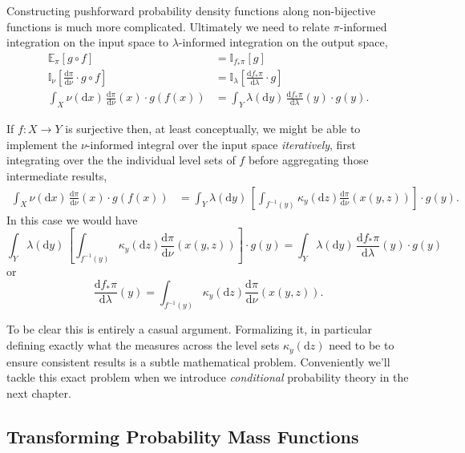 \documentclass[
  letterpaper,
  DIV=11,
  numbers=noendperiod]{scrartcl}
\begin{document}
Constructing pushforward probability density functions along
non-bijective functions is much more complicated. Ultimately we need to
relate \(\pi\)-informed integration on the input space to
\(\lambda\)-informed integration on the output space, \begin{align*}
\mathbb{E}_{\pi}[g \circ f]
&=
\mathbb{I}_{f_{*} \pi}[g]
\\
\mathbb{I}_{\nu} \left[
\frac{ \mathrm{d} \pi }{ \mathrm{d} \nu } \cdot g \circ f
\right]
&=
\mathbb{I}_{\lambda} \left[
\frac{ \mathrm{d} f_{*} \pi }{ \mathrm{d} \lambda } \cdot g
\right]
\\
\int_{X} \nu(\mathrm{d}x) \,
\frac{ \mathrm{d} \pi }{ \mathrm{d} \nu }(x) \cdot g(f(x))
&=
\int_{Y} \lambda(\mathrm{d}y) \,
\frac{ \mathrm{d} f_{*} \pi }{ \mathrm{d} \lambda }(y) \cdot g(y).
\end{align*}

If \(f: X \rightarrow Y\) is surjective then, at least conceptually, we
might be able to implement the \(\nu\)-informed integral over the input
space \emph{iteratively}, first integrating over the the individual
level sets of \(f\) before aggregating those intermediate results,
\begin{align*}
\int_{X} \nu(\mathrm{d}x) \,
\frac{ \mathrm{d} \pi }{ \mathrm{d} \nu }(x) \cdot g(f(x))
&=
\int_{Y} \lambda(\mathrm{d}y) \,
\left[
\int_{f^{-1}(y)} \kappa_{y}(\mathrm{d}z)
\frac{ \mathrm{d} \pi }{ \mathrm{d} \nu }(x(y, z))
\right] \cdot g(y).
\end{align*} In this case we would have \[
\int_{Y} \lambda(\mathrm{d}y) \,
\left[
\int_{f^{-1}(y)} \kappa_{y}(\mathrm{d}z)
\frac{ \mathrm{d} \pi }{ \mathrm{d} \nu }(x(y, z))
\right] \cdot g(y)
=
\int_{Y} \lambda(\mathrm{d}y) \,
\frac{ \mathrm{d} f_{*} \pi }{ \mathrm{d} \lambda }(y) \cdot g(y)
\] or \[
\frac{ \mathrm{d} f_{*} \pi }{ \mathrm{d} \lambda }(y)
=
\int_{f^{-1}(y)} \kappa_{y}(\mathrm{d}z)
\frac{ \mathrm{d} \pi }{ \mathrm{d} \nu }(x(y, z)).
\]

To be clear this is entirely a casual argument. Formalizing it, in
particular defining exactly what the measures across the level sets
\(\kappa_{y}(\mathrm{d}z)\) need to be to ensure consistent results is a
subtle mathematical problem. Conveniently we'll tackle this exact
problem when we introduce \emph{conditional} probability theory in the
next chapter.

\hypertarget{transforming-probability-mass-functions}{%
\subsection{Transforming Probability Mass
Functions}\label{transforming-probability-mass-functions}}
\end{document}
